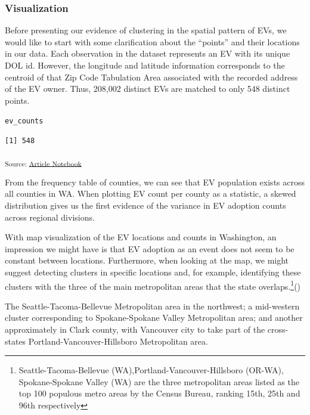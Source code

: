 \documentclass[
  letterpaper,
  DIV=11,
  numbers=noendperiod]{scrartcl}
\begin{document}
\subsubsection{Visualization}\label{visualization}

Before presenting our evidence of clustering in the spatial pattern of
EVs, we would like to start with some clarification about the ``points''
and their locations in our data. Each observation in the dataset
represents an EV with its unique DOL id. However, the longitude and
latitude information corresponds to the centroid of that Zip Code
Tabulation Area associated with the recorded address of the EV owner.
Thus, 208,002 distinct EVs are matched to only 548 distinct points.

\texttt{ev\_counts}

\begin{verbatim}
[1] 548
\end{verbatim}

\textsubscript{Source:
\href{https://h-christy.github.io/24-manuscript/index.qmd.html}{Article
Notebook}}

From the frequency table of counties, we can see that EV population
exists across all counties in WA. When plotting EV count per county as a
statistic, a skewed distribution gives us the first evidence of the
variance in EV adoption counts across regional divisions.

With map visualization of the EV locations and counts in Washington, an
impression we might have is that EV adoption as an event does not seem
to be constant between locations. Furthermore, when looking at the map,
we might suggest detecting clusters in specific locations and, for
example, identifying these clusters with the three of the main
metropolitan areas that the state
overlaps.\footnote{Seattle-Tacoma-Bellevue
  (WA),Portland-Vancouver-Hillsboro (OR-WA), Spokane-Spokane Valley (WA)
  are the three metropolitan areas listed as the top 100 populous metro
  areas by the Census Bureau, ranking 15th, 25th and 96th respectively}()

The Seattle-Tacoma-Bellevue Metropolitan area in the northwest; a
mid-western cluster corresponding to Spokane-Spokane Valley Metropolitan
area; and another approximately in Clark county, with Vancouver city to
take part of the cross-states Portland-Vancouver-Hillsboro Metropolitan
area.
\end{document}
